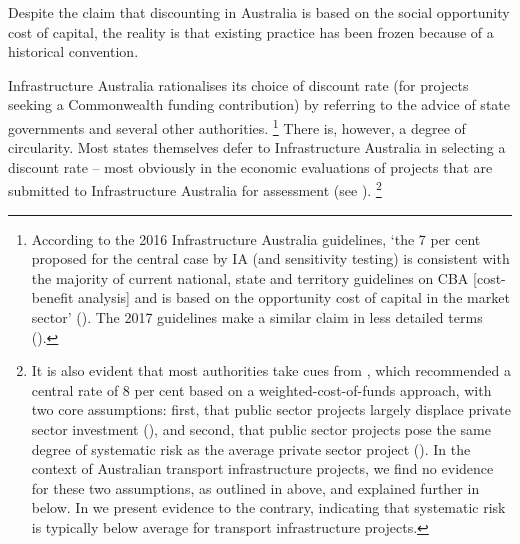 \documentclass{grattan}
\begin{document}
Despite the claim that discounting in Australia is based on the social opportunity cost of capital, the reality is that existing practice has been frozen because of a historical convention. 

Infrastructure Australia rationalises its choice of discount rate (for projects seeking a Commonwealth funding contribution) by referring to the advice of state governments and several other authorities.%
    \footnote{According to the 2016 Infrastructure Australia guidelines, `the 7 per cent proposed for the central case by IA (and sensitivity testing) is consistent with the majority of current national, state and territory guidelines on CBA [cost-benefit analysis] and is based on the opportunity cost of capital in the market sector' (\textcite[][37]{IA-Assessment-Framework-January-2016}). The 2017 guidelines make a similar claim in less detailed terms (\textcite[][100]{IA-Assessment-Framework-June-2017}).}
There is, however, a degree of circularity. Most states themselves defer to Infrastructure Australia in selecting a discount rate -- most obviously in the economic evaluations of projects that are submitted to Infrastructure Australia for assessment (see ).%
    \footnote{It is also evident that most authorities take cues from \textcite{Harrison-Valuing-the-Future}, which recommended a central rate of 8 per cent based on a weighted-cost-of-funds approach, with two core assumptions: first, that public sector projects largely displace private sector investment (\textcite[][32]{Harrison-Valuing-the-Future}), and second, that public sector projects pose the same degree of systematic risk as the average private sector project (\textcite[][60]{Harrison-Valuing-the-Future}). In the context of Australian transport infrastructure projects, we find no evidence for these two assumptions, as outlined in  above, and explained further in  below. In  we present evidence to the contrary, indicating that systematic risk is typically below average for transport infrastructure projects.}
\end{document}
